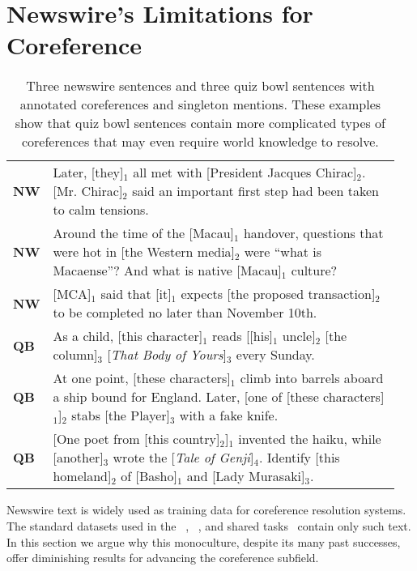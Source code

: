 \section{Newswire's Limitations for Coreference}
\label{sec:newswire-bad}

\begin{table*}
\begin{tabular*}{\linewidth}{p{0.05\linewidth}|p{0.9\linewidth}@{}}
\hline
\textbf{NW} & Later, [they]$_1$ all met with [President Jacques Chirac]$_2$. [Mr. Chirac]$_2$ said an important first step had been taken to calm tensions. \\
\textbf{NW} & Around the time of the [Macau]$_1$ handover, questions that were hot in [the Western media]$_2$ were ``what is Macaense''? And what is native [Macau]$_1$ culture?  \\
\textbf{NW} & [MCA]$_1$ said that [it]$_1$ expects [the proposed transaction]$_2$ to be completed no later than November 10th. \\
\hline
\textbf{QB} & As a child, [this character]$_1$ reads [[his]$_1$ uncle]$_2$ [the column]$_3$ [\emph{That Body of Yours}]$_3$ every Sunday. \\
\textbf{QB} & At one point, [these characters]$_1$ climb into barrels aboard a ship bound for England. Later, [one of [these characters]$_1$]$_2$ stabs [the Player]$_3$ with a fake knife. \\
\textbf{QB} & [One poet from [this country]$_2$]$_1$ invented the haiku, while [another]$_3$ wrote the [\emph{Tale of Genji}]$_4$. Identify [this homeland]$_2$ of [Basho]$_1$ and [Lady Murasaki]$_3$. \\
\hline
\end{tabular*}
\caption{Three newswire sentences and three quiz bowl sentences with annotated coreferences and singleton mentions. These examples show that quiz bowl sentences contain more complicated types of coreferences that may even require world knowledge to resolve.}
\label{table1}
\end{table*}

Newswire text is widely used as training data for coreference
resolution systems. The standard datasets used in the
~\cite{MUC-6,MUC-7},
~\cite{doddington2004automatic}, and \conll{} shared
tasks~\cite{Pradhan:2011:CST:2132936.2132937} contain only such
text. In this section we argue why this monoculture, despite its many
past successes, offer diminishing results for advancing the
coreference subfield.


